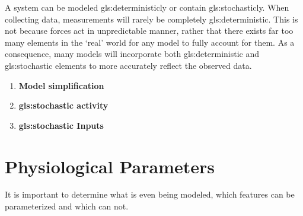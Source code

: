 A system can be modeled \gls{gls:deterministic}ly or contain \gls{gls:stochastic}ly. When collecting data, measurements will rarely be completely \gls{gls:deterministic}. This is not because forces act in unpredictable manner, rather that there exists far too many elements in the `real' world for any model to fully account for them. 
As a consequence, many models will incorporate both \gls{gls:deterministic} and \gls{gls:stochastic} elements to more accurately reflect the observed data.
\begin{enumerate}
    \item \textbf{Model simplification}
    \item \textbf{\Gls{gls:stochastic} activity}
    \item \textbf{\Gls{gls:stochastic} Inputs}
\end{enumerate}



\newpage
\section{Physiological Parameters}
It is important to determine what is even being modeled, which features can be parameterized and which can not.




